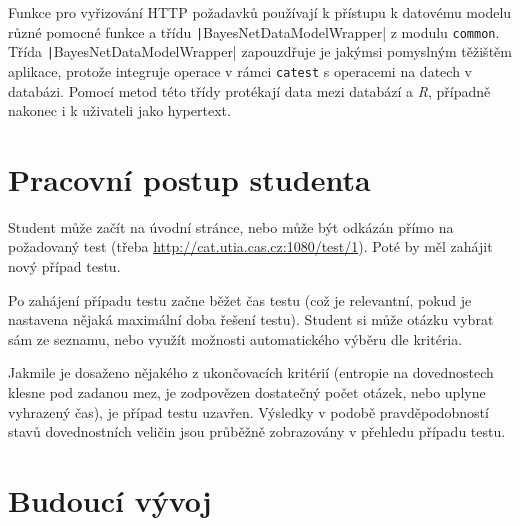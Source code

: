 \documentclass[a4paper,twoside,12pt]{scrbook}
\begin{document}
Funkce pro vyřizování HTTP požadavků používají k přístupu k datovému modelu různé pomocné funkce a třídu \texttt|BayesNetDataModelWrapper| z modulu \texttt{common}. Třída \texttt|BayesNetDataModelWrapper| zapouzdřuje je jakýmsi pomyslným těžištěm aplikace, protože integruje operace v rámci \texttt{catest} s operacemi na datech v databázi. Pomocí metod této třídy protékají data mezi databází a \textit{R}, případně nakonec i k uživateli jako hypertext.

\section{Pracovní postup studenta}
Student může začít na úvodní stránce, nebo může být odkázán přímo na požadovaný test (třeba \url{http://cat.utia.cas.cz:1080/test/1}). Poté by měl zahájit nový případ testu.

Po zahájení případu testu začne běžet čas testu (což je relevantní, pokud je nastavena nějaká maximální doba řešení testu). Student si může otázku vybrat sám ze seznamu, nebo využít možnosti automatického výběru dle kritéria.

Jakmile je dosaženo nějakého z ukončovacích kritérií (entropie na dovednostech klesne pod zadanou mez, je zodpovězen dostatečný počet otázek, nebo uplyne vyhrazený čas), je případ testu uzavřen. Výsledky v podobě pravděpodobností stavů dovednostních veličin jsou průběžně zobrazovány v přehledu případu testu.


\section{Budoucí vývoj}



\end{document}
